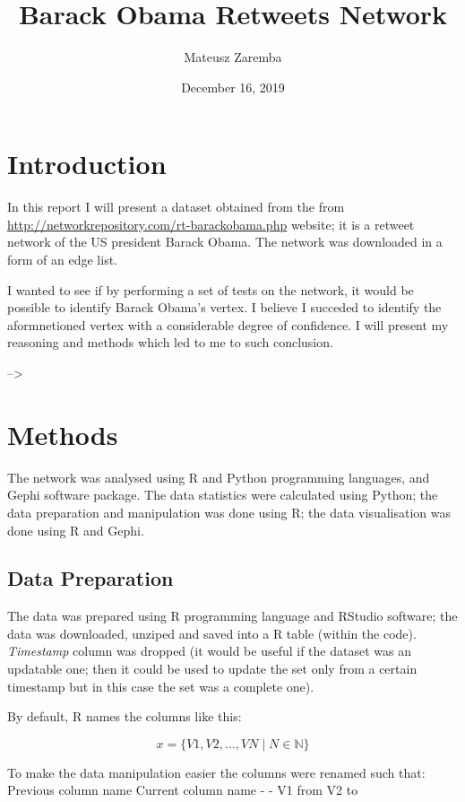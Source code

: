 \documentclass[
]{article}
\title{Barack Obama Retweets Network}
\author{Mateusz Zaremba}
\date{December 16, 2019}
\begin{document}
\maketitle

\hypertarget{introduction}{%
\section{Introduction}\label{introduction}}

In this report I will present a dataset obtained from the from
\url{http://networkrepository.com/rt-barackobama.php} website; it is a
retweet network of the US president Barack Obama. The network was
downloaded in a form of an edge list.

I wanted to see if by performing a set of tests on the network, it would
be possible to identify Barack Obama's vertex. I believe I succeded to
identify the aformnetioned vertex with a considerable degree of
confidence. I will present my reasoning and methods which led to me to
such conclusion.

--\textgreater{}

\hypertarget{methods}{%
\section{Methods}\label{methods}}

The network was analysed using R and Python programming languages, and
Gephi software package. The data statistics were calculated using
Python; the data preparation and manipulation was done using R; the data
visualisation was done using R and Gephi.

\hypertarget{data-preparation}{%
\subsection{Data Preparation}\label{data-preparation}}

The data was prepared using R programming language and RStudio software;
the data was downloaded, unziped and saved into a R table (within the
code). \emph{Timestamp} column was dropped (it would be useful if the
dataset was an updatable one; then it could be used to update the set
only from a certain timestamp but in this case the set was a complete
one).

By default, R names the columns like this:

\[  x =  \big\{V1, V2, ... , VN \mid N \in \mathbb{N} \big\}  \]

To make the data manipulation easier the columns were renamed such that:
\textbar{} Previous column name \textbar{} Current column name
\textbar{} \textbar{} - \textbar{} - \textbar{} \textbar{} V1 \textbar{}
from \textbar{} \textbar{} V2 \textbar{} to \textbar{}
\end{document}
